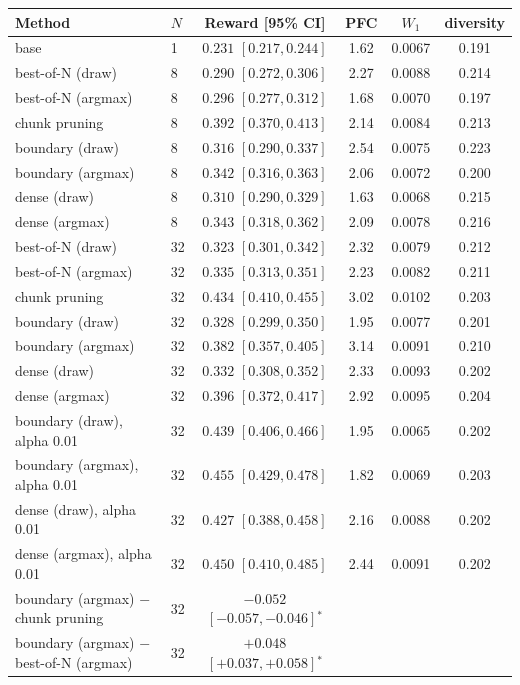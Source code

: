 \begin{tabular}{llcccc}
\toprule
Method & $N$ & Reward [95\% CI] & PFC & $W_1$ & diversity \\
\midrule
base & 1 & $0.231$ $[0.217, 0.244]$ & 1.62 & 0.0067 & 0.191 \\
best-of-N (draw) & 8 & $0.290$ $[0.272, 0.306]$ & 2.27 & 0.0088 & 0.214 \\
best-of-N (argmax) & 8 & $0.296$ $[0.277, 0.312]$ & 1.68 & 0.0070 & 0.197 \\
chunk pruning & 8 & $0.392$ $[0.370, 0.413]$ & 2.14 & 0.0084 & 0.213 \\
boundary (draw) & 8 & $0.316$ $[0.290, 0.337]$ & 2.54 & 0.0075 & 0.223 \\
boundary (argmax) & 8 & $0.342$ $[0.316, 0.363]$ & 2.06 & 0.0072 & 0.200 \\
dense (draw) & 8 & $0.310$ $[0.290, 0.329]$ & 1.63 & 0.0068 & 0.215 \\
dense (argmax) & 8 & $0.343$ $[0.318, 0.362]$ & 2.09 & 0.0078 & 0.216 \\
best-of-N (draw) & 32 & $0.323$ $[0.301, 0.342]$ & 2.32 & 0.0079 & 0.212 \\
best-of-N (argmax) & 32 & $0.335$ $[0.313, 0.351]$ & 2.23 & 0.0082 & 0.211 \\
chunk pruning & 32 & $0.434$ $[0.410, 0.455]$ & 3.02 & 0.0102 & 0.203 \\
boundary (draw) & 32 & $0.328$ $[0.299, 0.350]$ & 1.95 & 0.0077 & 0.201 \\
boundary (argmax) & 32 & $0.382$ $[0.357, 0.405]$ & 3.14 & 0.0091 & 0.210 \\
dense (draw) & 32 & $0.332$ $[0.308, 0.352]$ & 2.33 & 0.0093 & 0.202 \\
dense (argmax) & 32 & $0.396$ $[0.372, 0.417]$ & 2.92 & 0.0095 & 0.204 \\
boundary (draw), alpha 0.01 & 32 & $0.439$ $[0.406, 0.466]$ & 1.95 & 0.0065 & 0.202 \\
boundary (argmax), alpha 0.01 & 32 & $0.455$ $[0.429, 0.478]$ & 1.82 & 0.0069 & 0.203 \\
dense (draw), alpha 0.01 & 32 & $0.427$ $[0.388, 0.458]$ & 2.16 & 0.0088 & 0.202 \\
dense (argmax), alpha 0.01 & 32 & $0.450$ $[0.410, 0.485]$ & 2.44 & 0.0091 & 0.202 \\
\midrule
boundary (argmax) $-$ chunk pruning & 32 & $-0.052$ $[-0.057, -0.046]$$^*$ & & & \\
boundary (argmax) $-$ best-of-N (argmax) & 32 & $+0.048$ $[+0.037, +0.058]$$^*$ & & & \\

\end{tabular}

